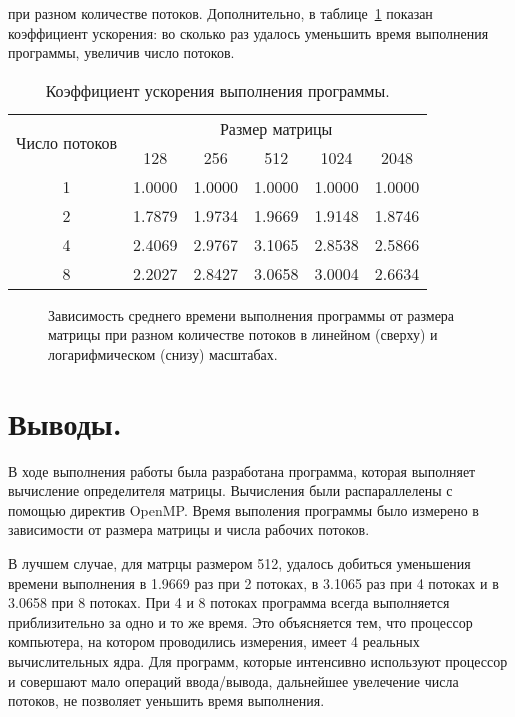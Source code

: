 \documentclass[a4paper,14pt]{extarticle}
\begin{document}
    при разном количестве потоков.
    Дополнительно, в таблице~\ref{tab:resm} показан коэффициент ускорения:
    во сколько раз удалось уменьшить время выполнения программы, увеличив число потоков.
    \begin{table}[h!]
        \centering
        \begin{tabular}{cccccc}
            \toprule
            \multirow{2}{*}{Число потоков} & \multicolumn{5}{c}{Размер матрицы} \\
            \cmidrule(l){2-6}
            &  128 & 256 & 512 & 1024 & 2048 \\
            \midrule
            1 & 1.0000 & 1.0000 & 1.0000 & 1.0000 & 1.0000 \\
            2 & 1.7879 & 1.9734 & 1.9669 & 1.9148 & 1.8746 \\
            4 & 2.4069 & 2.9767 & 3.1065 & 2.8538 & 2.5866 \\
            8 & 2.2027 & 2.8427 & 3.0658 & 3.0004 & 2.6634 \\
            \bottomrule
        \end{tabular}
        \caption{Коэффициент ускорения выполнения программы.}
        \label{tab:resm}
    \end{table}

    \begin{figure}[p]
        \centering
        
        
        \caption{
            Зависимость среднего времени выполнения программы от размера матрицы при разном количестве потоков
            в линейном (сверху) и логарифмическом (снизу) масштабах.
        }
        \label{fig:res}
    \end{figure}

    \section{Выводы.}

    В ходе выполнения работы была разработана программа, которая выполняет вычисление определителя матрицы.
    Вычисления были распараллелены с помощью директив OpenMP\@.
    Время выполения программы было измерено в зависимости от размера матрицы и числа рабочих потоков.

    В лучшем случае, для матрцы размером 512,
    удалось добиться уменьшения времени выполнения в 1.9669 раз при 2 потоках, в 3.1065 раз при 4 потоках и в 3.0658 при 8 потоках.
    При 4 и 8 потоках программа всегда выполняется приблизительно за одно и то же время.
    Это объясняется тем, что процессор компьютера, на котором проводились измерения,
    имеет 4 реальных вычислительных ядра.
    Для программ, которые интенсивно используют процессор и совершают мало операций ввода/вывода,
    дальнейшее увелечение числа потоков, не позволяет уеньшить время выполнения.
\end{document}
